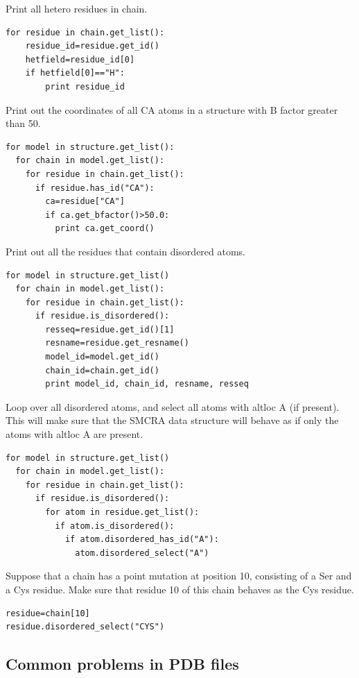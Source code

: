 \documentclass{report}
\begin{document}
Print all hetero residues in chain.

\begin{verbatim}
for residue in chain.get_list():
	residue_id=residue.get_id()
	hetfield=residue_id[0]
	if hetfield[0]=="H":
		print residue_id
\end{verbatim}

Print out the coordinates of all CA atoms in a structure with B factor greater
than 50.

\begin{verbatim}
for model in structure.get_list():
  for chain in model.get_list():
    for residue in chain.get_list():
      if residue.has_id("CA"):
        ca=residue["CA"]
        if ca.get_bfactor()>50.0:
          print ca.get_coord()
\end{verbatim}

Print out all the residues that contain disordered atoms.

\begin{verbatim}
for model in structure.get_list()
  for chain in model.get_list():
    for residue in chain.get_list():
      if residue.is_disordered():
        resseq=residue.get_id()[1]
        resname=residue.get_resname()
        model_id=model.get_id()
        chain_id=chain.get_id()
        print model_id, chain_id, resname, resseq
\end{verbatim}

Loop over all disordered atoms, and select all atoms with altloc A (if present).
This will make sure that the SMCRA data structure will behave as if only the
atoms with altloc A are present.

\begin{verbatim}
for model in structure.get_list()
  for chain in model.get_list():
    for residue in chain.get_list():
      if residue.is_disordered():
        for atom in residue.get_list():
          if atom.is_disordered():
            if atom.disordered_has_id("A"):
              atom.disordered_select("A")
\end{verbatim}

Suppose that a chain has a point mutation at position 10, consisting of a Ser
and a Cys residue. Make sure that residue 10 of this chain behaves as the Cys
residue.

\begin{verbatim}
residue=chain[10]
residue.disordered_select("CYS")
\end{verbatim}

\subsection{Common problems in PDB files}
\end{document}

